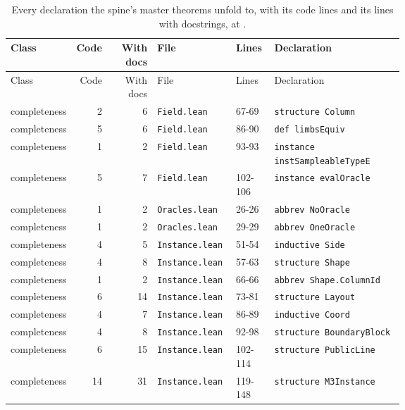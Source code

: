 {\footnotesize
\begin{longtable}{@{}>{\raggedright\arraybackslash}p{0.12\linewidth}rr>{\raggedright\arraybackslash}p{0.2\linewidth}l>{\raggedright\arraybackslash}p{0.33\linewidth}@{}}
\caption{Every declaration the spine's master theorems unfold to, with its code lines and its lines with docstrings, at .}\label{tab:gen-surface-spine-decls}\\
\toprule
Class & Code & With docs & File & Lines & Declaration \\
\midrule
\endfirsthead
\toprule
Class & Code & With docs & File & Lines & Declaration \\
\midrule
\endhead
\bottomrule
\endfoot
completeness & 2 & 6 & \texttt{Field.\allowbreak{}lean} & 67-69 & \texttt{structure Column} \\
completeness & 5 & 6 & \texttt{Field.\allowbreak{}lean} & 86-90 & \texttt{def limbsEquiv} \\
completeness & 1 & 2 & \texttt{Field.\allowbreak{}lean} & 93-93 & \texttt{instance instSampleableTypeE} \\
completeness & 5 & 7 & \texttt{Field.\allowbreak{}lean} & 102-106 & \texttt{instance evalOracle} \\
completeness & 1 & 2 & \texttt{Oracles.\allowbreak{}lean} & 26-26 & \texttt{abbrev NoOracle} \\
completeness & 1 & 2 & \texttt{Oracles.\allowbreak{}lean} & 29-29 & \texttt{abbrev OneOracle} \\
completeness & 4 & 5 & \texttt{Instance.\allowbreak{}lean} & 51-54 & \texttt{inductive Side} \\
completeness & 4 & 8 & \texttt{Instance.\allowbreak{}lean} & 57-63 & \texttt{structure Shape} \\
completeness & 1 & 2 & \texttt{Instance.\allowbreak{}lean} & 66-66 & \texttt{abbrev Shape.\allowbreak{}ColumnId} \\
completeness & 6 & 14 & \texttt{Instance.\allowbreak{}lean} & 73-81 & \texttt{structure Layout} \\
completeness & 4 & 7 & \texttt{Instance.\allowbreak{}lean} & 86-89 & \texttt{inductive Coord} \\
completeness & 4 & 8 & \texttt{Instance.\allowbreak{}lean} & 92-98 & \texttt{structure BoundaryBlock} \\
completeness & 6 & 15 & \texttt{Instance.\allowbreak{}lean} & 102-114 & \texttt{structure PublicLine} \\
completeness & 14 & 31 & \texttt{Instance.\allowbreak{}lean} & 119-148 & \texttt{structure M3Instance} \\

\end{longtable}}
